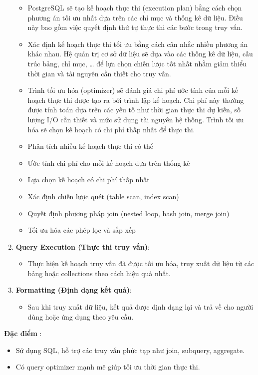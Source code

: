 \begin{enumerate}
\begin{itemize}
        \item PostgreSQL sẽ tạo kế hoạch thực thi (execution plan) bằng cách chọn phương án tối ưu nhất dựa trên các chỉ mục và thống kê dữ liệu. Điều này bao gồm việc quyết định thứ tự thực thi các bước trong truy vấn.
        \item Xác định kế hoạch thực thi tối ưu bằng cách cân nhắc nhiều phương án khác nhau. Hệ quản trị cơ sở dữ liệu sẽ dựa vào các thống kê dữ liệu, cấu trúc bảng, chỉ mục, … để lựa chọn chiến lược tốt nhất nhằm giảm thiểu thời gian và tài nguyên cần thiết cho truy vấn.
        \item Trình tối ưu hóa (optimizer) sẽ đánh giá chi phí ước tính của mỗi kế hoạch thực thi được tạo ra bởi trình lập kế hoạch. Chi phí này thường được tính toán dựa trên các yếu tố như thời gian thực thi dự kiến, số lượng I/O cần thiết và mức sử dụng tài nguyên hệ thống. Trình tối ưu hóa sẽ chọn kế hoạch có chi phí thấp nhất để thực thi.
        \item Phân tích nhiều kế hoạch thực thi có thể
        \item Ước tính chi phí cho mỗi kế hoạch dựa trên thống kê
        \item Lựa chọn kế hoạch có chi phí thấp nhất
        \item Xác định chiến lược quét (table scan, index scan)
        \item Quyết định phương pháp join (nested loop, hash join, merge join)
        \item Tối ưu hóa các phép lọc và sắp xếp
    \end{itemize}
    \item \textbf{Query Execution (Thực thi truy vấn)}:
    \begin{itemize}
        \item Thực hiện kế hoạch truy vấn đã được tối ưu hóa, truy xuất dữ liệu từ các bảng hoặc collections theo cách hiệu quả nhất.
    \end{itemize}
    \item \textbf{Formatting (Định dạng kết quả)}:
    \begin{itemize}
        \item Sau khi truy xuất dữ liệu, kết quả được định dạng lại và trả về cho người dùng hoặc ứng dụng theo yêu cầu.
    \end{itemize}
\end{enumerate}

\textbf{Đặc điểm} : 
\begin{itemize}
    \item Sử dụng SQL, hỗ trợ  các truy vấn phức tạp như join, subquery, aggregate.
    \item Có query optimizer mạnh mẽ giúp tối ưu thời gian thực thi.
\end{itemize}

